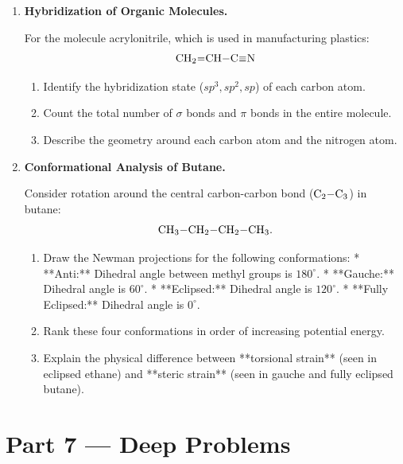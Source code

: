 \documentclass[12pt, a4paper]{book}
\begin{document}
\begin{problembox}
\begin{enumerate}[label=\textbf{P\arabic*.}]
  \item \textbf{Hybridization of Organic Molecules.}
  
        For the molecule acrylonitrile, which is used in manufacturing plastics:
        \[
          \ce{CH2=CH-C#N}
        \]
        \begin{enumerate}[label=(\alph*)]
          \item Identify the hybridization state ($sp^3, sp^2, sp$) of each carbon atom.
          \item Count the total number of $\sigma$ bonds and $\pi$ bonds in the entire molecule.
          \item Describe the geometry around each carbon atom and the nitrogen atom.
        \end{enumerate}

  \item \textbf{Conformational Analysis of Butane.}
  
        Consider rotation around the central carbon-carbon bond ($\ce{C2-C3}$) in butane:
        \[
          \ce{CH3-CH2-CH2-CH3}.
        \]
        \begin{enumerate}[label=(\alph*)]
          \item Draw the Newman projections for the following conformations:
                * **Anti:** Dihedral angle between methyl groups is $180^\circ$.
                * **Gauche:** Dihedral angle is $60^\circ$.
                * **Eclipsed:** Dihedral angle is $120^\circ$.
                * **Fully Eclipsed:** Dihedral angle is $0^\circ$.
          \item Rank these four conformations in order of increasing potential energy.
          \item Explain the physical difference between **torsional strain** (seen in eclipsed ethane) and **steric strain** (seen in gauche and fully eclipsed butane).
        \end{enumerate}
\end{enumerate}
\end{problembox}

\newpage

\section{Part 7 --- Deep Problems}
\end{document}
